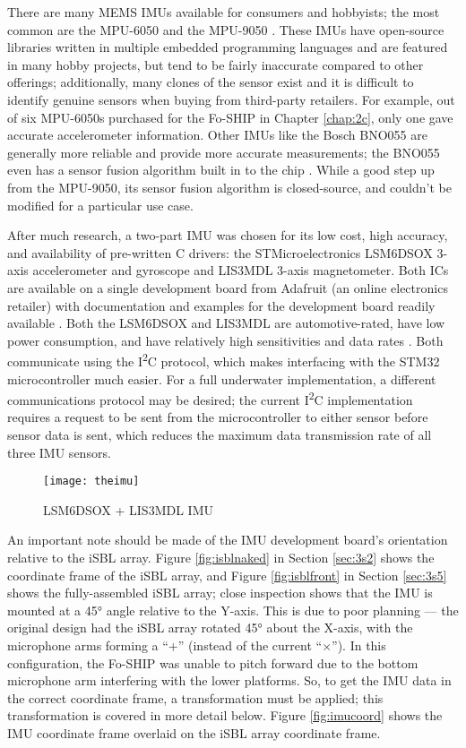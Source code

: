 \documentclass[11pt]{ucthesisCP}
\begin{document}
There are many MEMS IMUs available for consumers and hobbyists; the most common are the MPU-6050 and the MPU-9050 \cite{mpu6050}. These IMUs have open-source libraries written in multiple embedded programming languages and are featured in many hobby projects, but tend to be fairly inaccurate compared to other offerings; additionally, many clones of the sensor exist and it is difficult to identify genuine sensors when buying from third-party retailers. For example, out of six MPU-6050s purchased for the Fo-SHIP in Chapter \ref{chap:2c}, only one gave accurate accelerometer information. Other IMUs like the Bosch BNO055 are generally more reliable and provide more accurate measurements; the BNO055 even has a sensor fusion algorithm built in to the chip \cite{bno055}. While a good step up from the MPU-9050, its sensor fusion algorithm is closed-source, and couldn't be modified for a particular use case. 

After much research, a two-part IMU was chosen for its low cost, high accuracy, and availability of pre-written C drivers: the STMicroelectronics LSM6DSOX 3-axis accelerometer and gyroscope and LIS3MDL 3-axis magnetometer. Both ICs are available on a single development board from Adafruit (an online electronics retailer) with documentation and examples for the development board readily available \cite{adafruit}. Both the LSM6DSOX and LIS3MDL are automotive-rated, have low power consumption, and have relatively high sensitivities and data rates \cite{lsm6dsox} \cite{lis3mdl}. Both communicate using the I\textsuperscript{2}C protocol, which makes interfacing with the STM32 microcontroller much easier. For a full underwater implementation, a different communications protocol may be desired; the current I\textsuperscript{2}C implementation requires a request to be sent from the microcontroller to either sensor before sensor data is sent, which reduces the maximum data transmission rate of all three IMU sensors.

\begin{figure}[htbp]
	\centering
	\texttt{[image: theimu]}
	\caption{LSM6DSOX + LIS3MDL IMU \cite{adafruit}}
	\label{fig:theimu}
\end{figure}

An important note should be made of the IMU development board’s orientation relative to the iSBL array. Figure \ref{fig:isblnaked} in Section \ref{sec:3s2} shows the coordinate frame of the iSBL array, and Figure \ref{fig:isblfront} in Section \ref{sec:3s5} shows the fully-assembled iSBL array; close inspection shows that the IMU is mounted at a 45° angle relative to the Y-axis. This is due to poor planning --- the original design had the iSBL array rotated 45° about the X-axis, with the microphone arms forming a “+” (instead of the current “\(\times\)”). In this configuration, the Fo-SHIP was unable to pitch forward due to the bottom microphone arm interfering with the lower platforms. So, to get the IMU data in the correct coordinate frame, a transformation must be applied; this transformation is covered in more detail below. Figure \ref{fig:imucoord} shows the IMU coordinate frame overlaid on the iSBL array coordinate frame.
\end{document}
